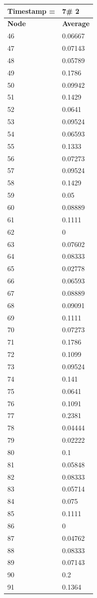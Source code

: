 \begin{tabular}{|l||l|}
\hline
\textbf{Timestamp =} & \textbf{7}\# 2\\\hline
	\textbf{Node} & \textbf{Average} \\ \hline
\hline
	46 & 0.06667 \\ \hline
	47 & 0.07143 \\ \hline
	48 & 0.05789 \\ \hline
	49 & 0.1786 \\ \hline
	50 & 0.09942 \\ \hline
	51 & 0.1429 \\ \hline
	52 & 0.0641 \\ \hline
	53 & 0.09524 \\ \hline
	54 & 0.06593 \\ \hline
	55 & 0.1333 \\ \hline
	56 & 0.07273 \\ \hline
	57 & 0.09524 \\ \hline
	58 & 0.1429 \\ \hline
	59 & 0.05 \\ \hline
	60 & 0.08889 \\ \hline
	61 & 0.1111 \\ \hline
	62 & 0 \\ \hline
	63 & 0.07602 \\ \hline
	64 & 0.08333 \\ \hline
	65 & 0.02778 \\ \hline
	66 & 0.06593 \\ \hline
	67 & 0.08889 \\ \hline
	68 & 0.09091 \\ \hline
	69 & 0.1111 \\ \hline
	70 & 0.07273 \\ \hline
	71 & 0.1786 \\ \hline
	72 & 0.1099 \\ \hline
	73 & 0.09524 \\ \hline
	74 & 0.141 \\ \hline
	75 & 0.0641 \\ \hline
	76 & 0.1091 \\ \hline
	77 & 0.2381 \\ \hline
	78 & 0.04444 \\ \hline
	79 & 0.02222 \\ \hline
	80 & 0.1 \\ \hline
	81 & 0.05848 \\ \hline
	82 & 0.08333 \\ \hline
	83 & 0.05714 \\ \hline
	84 & 0.075 \\ \hline
	85 & 0.1111 \\ \hline
	86 & 0 \\ \hline
	87 & 0.04762 \\ \hline
	88 & 0.08333 \\ \hline
	89 & 0.07143 \\ \hline
	90 & 0.2 \\ \hline
	91 & 0.1364 \\ \hline
\end{tabular}
